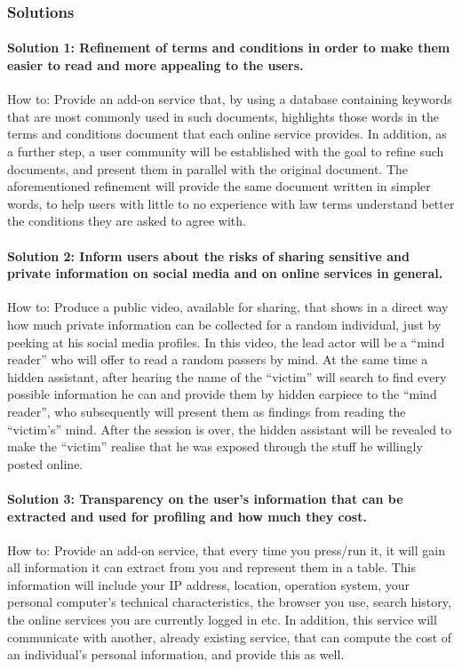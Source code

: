 \subsubsection{Solutions} 

\paragraph{Solution 1: Refinement of terms and conditions in order to make them 
easier to read and more appealing to the users.} 
How to: Provide an add-on service that, by using a database containing keywords 
that are most commonly used in such documents, highlights those words in the 
terms and conditions document that each online service provides. In addition, as 
a further step, a user community will be established with the goal to refine 
such documents, and present them in parallel with the original document. The 
aforementioned refinement will provide the same document written in simpler 
words, to help users with little to no experience with law terms understand 
better the conditions they are asked to agree with.

\paragraph{Solution 2: Inform users about the risks of sharing sensitive and 
private information on social media and on online services in general.} 
How to: Produce a public video, available for sharing, that shows in a direct 
way how much private information can be collected for a random individual, just 
by peeking at his social media profiles. In this video, the lead actor will be a 
``mind reader'' who will offer to read a random passers by mind. At the same 
time a hidden assistant, after hearing the name of the ``victim'' will search to 
find every possible information he can and provide them by hidden earpiece to 
the ``mind reader'', who subsequently will present them as findings from reading 
the ``victim's'' mind. After the session is over, the hidden assistant will be 
revealed to make the ``victim'' realise that he was exposed through the stuff he 
willingly posted online.

\paragraph{Solution 3: Transparency on the user's information that can be 
extracted and used for profiling and how much they cost.} 
How to: Provide an add-on service, that every time you press/run it, it will gain 
all information it can extract from you and represent them in a table. This 
information will include your IP address, location, operation system, your 
personal computer's technical characteristics, the browser you use, search 
history, the online services you are currently logged in etc. In addition, this 
service will communicate with another, already existing service, that can 
compute the cost of an individual's personal information, and provide this as 
well.

